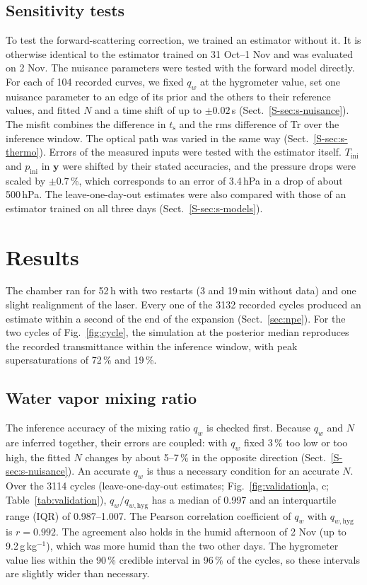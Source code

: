 \documentclass[preprint,review,12pt,authoryear]{elsarticle}
\begin{document}
\subsection{Sensitivity tests}
\label{sec:sens}
To test the forward-scattering correction, we trained an estimator without it. It is otherwise identical to
the estimator trained on 31 Oct--1 Nov and was evaluated on 2 Nov.
The nuisance parameters were tested with the forward model directly. For each of 104 recorded curves, we
fixed $q_w$ at the hygrometer value, set one nuisance parameter to an edge of its prior and the others to
their reference values, and fitted $N$ and a time shift of up to $\pm0.02$\,s
(Sect.~\ref{S-sec:s-nuisance}). The misfit combines the
difference in $t_\mathrm{s}$ and the rms difference
of Tr over the inference window. The optical path was varied in the same way
(Sect.~\ref{S-sec:s-thermo}).
Errors of the measured inputs were tested with the estimator itself. $T_\mathrm{ini}$ and
$p_\mathrm{ini}$ in $\bm{y}$ were shifted by their stated accuracies, and the pressure drops were
scaled by $\pm0.7$\,\%, which corresponds to an error of 3.4\,hPa in a drop of about 500\,hPa.
The leave-one-day-out estimates were also compared with those of an estimator trained on all three
days (Sect.~\ref{S-sec:s-models}).


\section{Results}
\label{sec:results}
The chamber ran for 52\,h with two restarts (3 and 19\,min without data) and one slight realignment of
the laser. Every one of the 3132 recorded cycles produced an estimate within a second of the end of
the expansion (Sect.~\ref{sec:npe}). For the two cycles of Fig.~\ref{fig:cycle}, the simulation at the
posterior median reproduces the recorded transmittance within the inference window, with peak
supersaturations of 72\,\% and 19\,\%.

\subsection{Water vapor mixing ratio}
The inference accuracy of the mixing ratio $q_w$ is checked first. Because $q_w$ and $N$ are inferred
together, their errors are coupled: with $q_w$ fixed 3\,\% too low or too high, the fitted $N$ changes
by about 5--7\,\% in the opposite direction (Sect.~\ref{S-sec:s-nuisance}). An accurate $q_w$ is thus a
necessary condition for an accurate $N$.
Over the 3114 cycles (leave-one-day-out estimates; Fig.~\ref{fig:validation}a, c;
Table~\ref{tab:validation}), $q_w/q_{w,\mathrm{hyg}}$ has a median of 0.997 and an interquartile range (IQR)
of
0.987--1.007. The Pearson correlation coefficient of $q_w$ with $q_{w,\mathrm{hyg}}$ is $r = 0.992$. The
agreement also holds in the humid afternoon of 2 Nov (up to 9.2\,g\,kg$^{-1}$), which was more humid than
the two other days. The hygrometer value lies
within the 90\,\% credible interval in 96\,\% of the cycles, so these intervals are slightly wider than
necessary.
\end{document}
